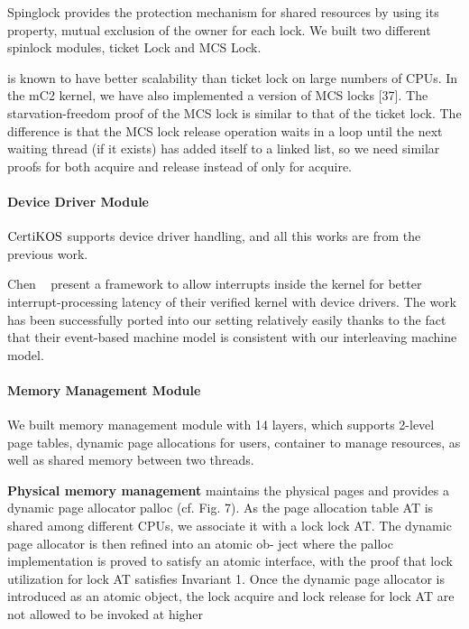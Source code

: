 Spinglock provides the protection mechanism for shared resources by using its property, mutual exclusion of the owner for each lock. 
We built two different spinlock modules, ticket Lock and MCS Lock.

is known to have better scalability than ticket lock on large numbers of CPUs. In the mC2 kernel, we have also implemented a version of MCS locks [37]. The starvation-freedom proof of the MCS lock is similar to that of the ticket lock. The difference is that the MCS lock release operation waits in a loop until the next waiting thread (if it exists) has added itself to a linked list, so we need similar proofs for both acquire and release instead of only for acquire.


\paragraph{Device Driver Module}

$\mathrm{CertiKOS}$ supports device driver handling, and all this works are from the previous work.

 Chen \etal~
 present a framework to allow interrupts inside the kernel for better interrupt-processing latency of their verified kernel with device drivers. The work has been successfully ported into our setting relatively easily thanks to the fact that their event-based machine model is consistent with our interleaving machine model.
 

\paragraph{Memory Management Module}

We built memory management module with 14 layers, 
which supports 2-level page tables, dynamic page allocations for users, 
container to manage resources, 
as well as shared memory between two threads. 

\textbf{Physical memory management} maintains the physical pages and provides a dynamic page allocator palloc (cf. Fig. 7). As the page allocation table AT is shared among different CPUs, we associate it with a lock lock AT. The dynamic page allocator is then refined into an atomic ob- ject where the palloc implementation is proved to satisfy an atomic interface, with the proof that lock utilization for lock AT satisfies Invariant 1. Once the dynamic page allocator is introduced as an atomic object, the lock acquire and lock release for lock AT are not allowed to be invoked at higher

